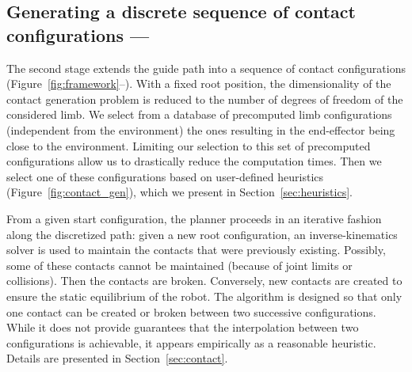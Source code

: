 \subsection{Generating a discrete sequence of contact configurations --- \Pb}

The second stage extends the guide path into a sequence of contact configurations (Figure~\ref{fig:framework}--\Pb).
With a fixed root position, the dimensionality of the 
contact generation problem is reduced to the number of degrees of freedom of the considered limb. 
We select from a database of precomputed limb configurations (independent from the environment) the ones resulting in the end-effector being close to the environment.
Limiting our selection to this set of precomputed configurations allow us to drastically reduce the computation times. 
Then we select one of these configurations based on user-defined heuristics (Figure~\ref{fig:contact_gen}), which we present in Section~\ref{sec:heuristics}.

From a given start configuration, the planner proceeds in an iterative fashion along the discretized path: given a new root configuration, an inverse-kinematics solver 
is used to maintain the contacts that were previously existing. Possibly, some of these contacts cannot be maintained (because of joint limits or collisions).
Then the contacts are broken. Conversely, new contacts are created to ensure the static equilibrium of the robot.
The algorithm is designed so that only one contact can be created or broken between two successive configurations. While it does not provide guarantees that the interpolation between two configurations is achievable, it appears empirically as a reasonable heuristic.
Details are presented in Section~\ref{sec:contact}. 


